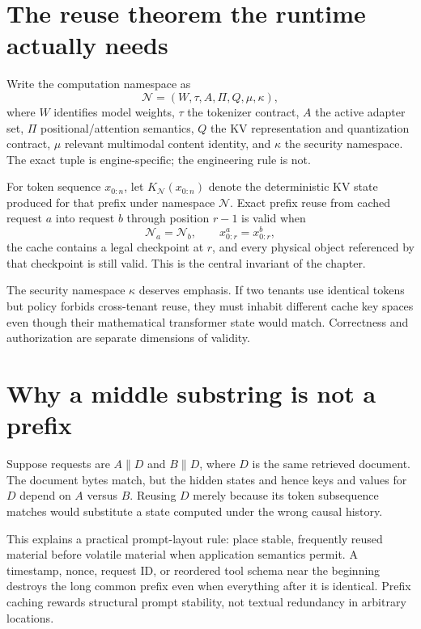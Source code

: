 \section{The reuse theorem the runtime actually needs}

Write the computation namespace as
\[
\mathcal N=(W,\tau,A,\Pi,Q,\mu,\kappa),
\]
where $W$ identifies model weights, $\tau$ the tokenizer contract, $A$ the active
adapter set, $\Pi$ positional/attention semantics, $Q$ the KV representation and
quantization contract, $\mu$ relevant multimodal content identity, and $\kappa$ the
security namespace. The exact tuple is engine-specific; the engineering rule is not.

For token sequence $x_{0:n}$, let $K_{\mathcal N}(x_{0:n})$ denote the deterministic
KV state produced for that prefix under namespace $\mathcal N$. Exact prefix reuse
from cached request $a$ into request $b$ through position $r-1$ is valid when
\[
\mathcal N_a=\mathcal N_b,\qquad
x^a_{0:r}=x^b_{0:r},
\]
the cache contains a legal checkpoint at $r$, and every physical object referenced by
that checkpoint is still valid. This is the central invariant of the chapter.

The security namespace $\kappa$ deserves emphasis. If two tenants use identical
tokens but policy forbids cross-tenant reuse, they must inhabit different cache key
spaces even though their mathematical transformer state would match. Correctness and
authorization are separate dimensions of validity.

\section{Why a middle substring is not a prefix}

Suppose requests are $A\|D$ and $B\|D$, where $D$ is the same retrieved document.
The document bytes match, but the hidden states and hence keys and values for $D$
depend on $A$ versus $B$. Reusing $D$ merely because its token subsequence matches
would substitute a state computed under the wrong causal history.

This explains a practical prompt-layout rule: place stable, frequently reused
material before volatile material when application semantics permit. A timestamp,
nonce, request ID, or reordered tool schema near the beginning destroys the long
common prefix even when everything after it is identical. Prefix caching rewards
structural prompt stability, not textual redundancy in arbitrary locations.

